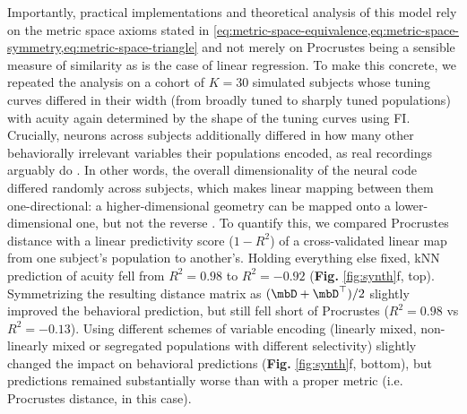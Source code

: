 Importantly, practical implementations and theoretical analysis of this model rely on the metric space axioms stated in \cref{eq:metric-space-equivalence,eq:metric-space-symmetry,eq:metric-space-triangle} and not merely on Procrustes being a sensible measure of similarity as is the case of linear regression. To make this concrete, we repeated the analysis on a cohort of $K = 30$ simulated subjects whose tuning curves differed in their width (from broadly tuned to sharply tuned populations) with acuity again determined by the shape of the tuning curves using FI. Crucially, neurons across subjects additionally differed in how many other behaviorally irrelevant variables their populations encoded, as real recordings arguably do \parencite{rigotti2013,tye2024}. In other words, the overall dimensionality of the neural code differed randomly across subjects, which makes linear mapping between them one-directional: a higher-dimensional geometry can be mapped onto a lower-dimensional one, but not the reverse \parencite{elmoznino2024,muzellec2026reverse}. To quantify this, we compared Procrustes distance with a linear predictivity score ($1 - R^2$) of a cross-validated linear map from one subject's population to another's. Holding everything else fixed, kNN prediction of acuity fell from $R^2 = 0.98$ to $R^2 = -0.92$ (\textbf{Fig. } \ref{fig:synth}f, top). Symmetrizing the resulting distance matrix as $(\mbD+\mbD^\top)/2$ slightly improved the behavioral prediction, but still fell short of Procrustes ($R^2 = 0.98$ vs $R^2 = -0.13$). Using different schemes of variable encoding (linearly mixed, non-linearly mixed or segregated populations with different selectivity) slightly changed the impact on behavioral predictions (\textbf{Fig. } \ref{fig:synth}f, bottom), but predictions remained substantially worse than with a proper metric (i.e. Procrustes distance, in this case). 